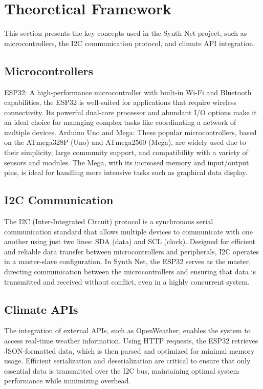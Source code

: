 \documentclass[a4paper,12pt]{report}
\begin{document}
\newpage

\chapter{Theoretical Framework}
This section presents the key concepts used in the Synth Net project, such as microcontrollers, the I2C communication protocol, and climate API integration.

\section{Microcontrollers}

ESP32: A high-performance microcontroller with built-in Wi-Fi and Bluetooth capabilities, the ESP32 is well-suited for applications that require wireless connectivity. Its powerful dual-core processor and abundant I/O options make it an ideal choice for managing complex tasks like coordinating a network of multiple devices.
Arduino Uno and Mega: These popular microcontrollers, based on the ATmega328P (Uno) and ATmega2560 (Mega), are widely used due to their simplicity, large community support, and compatibility with a variety of sensors and modules. The Mega, with its increased memory and input/output pins, is ideal for handling more intensive tasks such as graphical data display.

\section{I2C Communication}
The I2C (Inter-Integrated Circuit) protocol is a synchronous serial communication standard that allows multiple devices to communicate with one another using just two lines: SDA (data) and SCL (clock). Designed for efficient and reliable data transfer between microcontrollers and peripherals, I2C operates in a master-slave configuration. In Synth Net, the ESP32 serves as the master, directing communication between the microcontrollers and ensuring that data is transmitted and received without conflict, even in a highly concurrent system.

\section{Climate APIs}
The integration of external APIs, such as OpenWeather, enables the system to access real-time weather information. Using HTTP requests, the ESP32 retrieves JSON-formatted data, which is then parsed and optimized for minimal memory usage. Efficient serialization and deserialization are critical to ensure that only essential data is transmitted over the I2C bus, maintaining optimal system performance while minimizing overhead.
\end{document}
